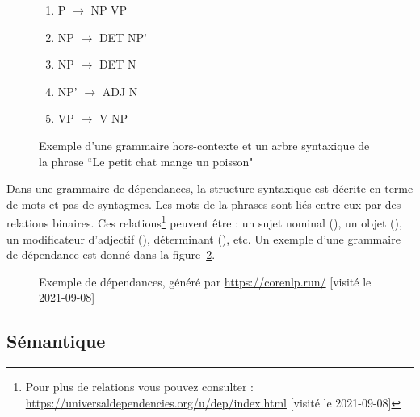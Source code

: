 \documentclass{KodeBook}
\begin{document}
\begin{figure}[ht]
	\centering
	\begin{minipage}{0.3\textwidth}
		\begin{enumerate}
			\item P $ \rightarrow $ NP VP
			\item NP $ \rightarrow $ DET NP'
			\item NP $ \rightarrow $ DET N
			\item NP' $ \rightarrow $ ADJ N
			\item VP $ \rightarrow $ V NP
		\end{enumerate}
	\end{minipage}
	\begin{minipage}{0.3\textwidth}
	\end{minipage}

	\caption[Exemple d'une grammaire hors-contexte et un arbre syntaxique]{Exemple d'une grammaire hors-contexte et un arbre syntaxique de la phrase ``Le petit chat mange un poisson"}
	\label{fig.exp-gram-const}

\end{figure}

Dans une grammaire de dépendances, la structure syntaxique est décrite en terme de mots et pas de syntagmes.
Les mots de la phrases sont liés entre eux par des relations binaires. 
Ces relations\footnote{Pour plus de relations vous pouvez consulter : \url{https://universaldependencies.org/u/dep/index.html} [visité le 2021-09-08]} peuvent être : un sujet nominal (), un objet (), un modificateur d'adjectif (), déterminant (), etc.
Un exemple d'une grammaire de dépendance est donné dans la figure~\ref{fig:exp-gram-dep}.

\begin{figure}[ht]
	\centering
	\caption[Exemple de dépendances]{Exemple de dépendances, généré par \url{https://corenlp.run/} [visité le 2021-09-08] \label{fig:exp-gram-dep}}
\end{figure}

\subsection{Sémantique}
\end{document}
